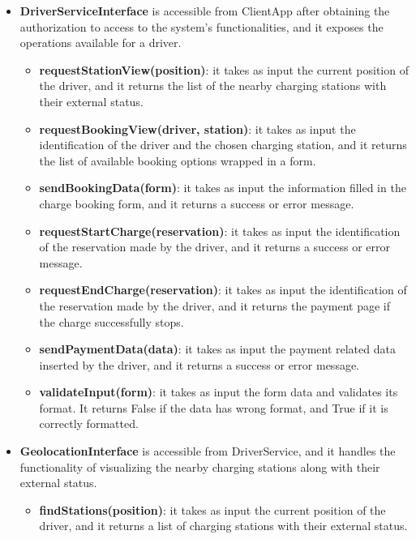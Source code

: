 \documentclass[../main.tex]{subfiles}
\begin{document}
\begin{itemize}
    \item \textbf{DriverServiceInterface} is accessible from ClientApp after obtaining the authorization to access to the system's functionalities, and it exposes the operations available for a driver.
    \begin{itemize}
        \item \textbf{requestStationView(position)}: it takes as input the current position of the driver, and it returns the list of the nearby charging stations with their external status.
        \item \textbf{requestBookingView(driver, station)}: it takes as input the identification of the driver and the chosen charging station, and it returns the list of available booking options wrapped in a form.
        \item \textbf{sendBookingData(form)}: it takes as input the information filled in the charge booking form, and it returns a success or error message.
        \item \textbf{requestStartCharge(reservation)}: it takes as input the identification of the reservation made by the driver, and it returns a success or error message.
        \item \textbf{requestEndCharge(reservation)}: it takes as input the identification of the reservation made by the driver, and it returns the payment page if the charge successfully stops.
        \item \textbf{sendPaymentData(data)}: it takes as input the payment related data inserted by the driver, and it returns a success or error message.
        \item \textbf{validateInput(form)}: it takes as input the form data and validates its format. It returns False if the data has wrong format, and True if it is correctly formatted.
    \end{itemize}

    \item \textbf{GeolocationInterface} is accessible from DriverService, and it handles the functionality of visualizing the nearby charging stations along with their external status. 
    \begin{itemize}
        \item \textbf{findStations(position)}: it takes as input the current position of the driver, and it returns a list of charging stations with their external status.
    \end{itemize}


\end{itemize}
\end{document}
